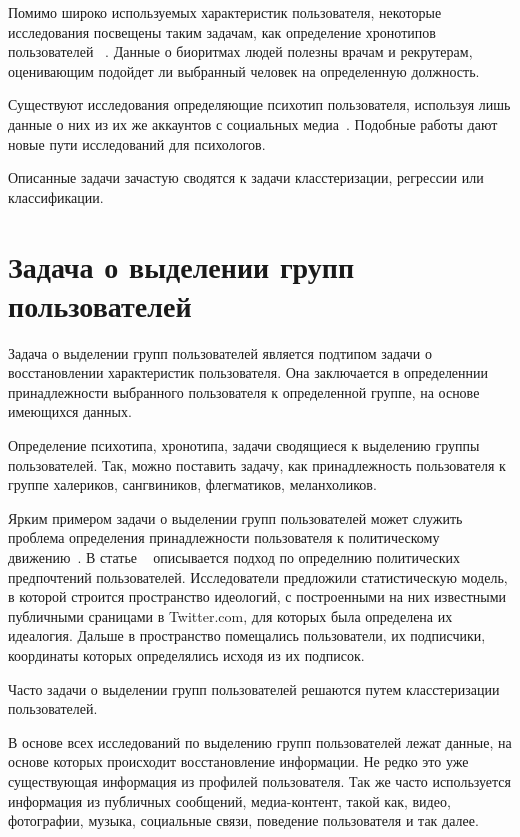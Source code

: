 \documentclass[annotation,times,page4]{itmo-student-thesis}
\begin{document}
Помимо широко используемых характеристик пользователя, некоторые исследования посвещены таким задачам, как определение хронотипов пользователей ~\cite{blachnio2015facebook}. Данные о биоритмах людей полезны врачам и рекрутерам, оценивающим подойдет ли выбранный человек на определенную должность.

Существуют исследования определяющие психотип пользователя, используя лишь данные о них из их же аккаунтов с социальных медиа~\cite{schwartz2013personality}. Подобные работы дают новые пути исследований для психологов.

Описанные задачи зачастую сводятся к задачи класстеризации, регрессии или классификации.

\section{Задача о выделении групп пользователей}
Задача о выделении групп пользователей является подтипом задачи о восстановлении характеристик пользователя. Она заключается в определеннии принадлежности выбранного пользователя к определенной группе, на основе имеющихся данных. 

Определение психотипа, хронотипа, задачи сводящиеся к выделению группы пользователей. Так, можно поставить задачу, как принадлежность пользователя к группе халериков, сангвиников, флегматиков, меланхоликов.

Ярким примером задачи о выделении групп пользователей может служить проблема определения принадлежности пользователя к политическому движению~\cite{barbera2015tweeting, yardi2010dynamic, lo2014common, bonica2013ideology, gruzd2014investigating}. В статье ~\cite{barbera2015tweeting} описывается подход по определнию политических предпочтений пользователей. Исследователи предложили статистическую модель, в которой строится пространство идеологий, с построенными на них известными публичными сраницами в Twitter.com, для которых была определена их идеалогия. Дальше в пространство помещались пользователи, их подписчики, координаты которых определялись исходя из их подписок.

Часто задачи о выделении групп пользователей решаются путем класстеризации пользователей.

В основе всех исследований по выделению групп пользователей лежат данные, на основе которых происходит восстановление информации. Не редко это уже существующая информация из профилей пользователя. Так же часто используется информация из публичных сообщений, медиа-контент, такой как, видео, фотографии, музыка, социальные связи, поведение пользователя и так далее.
\end{document}
